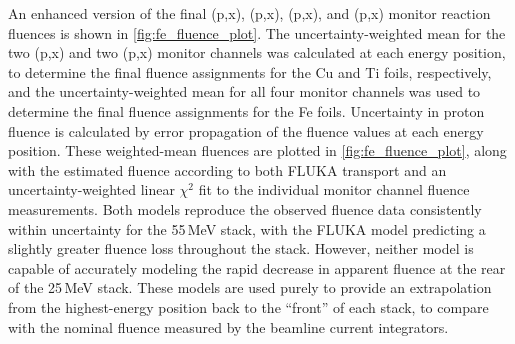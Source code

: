 % 
An enhanced version of the final (p,x), (p,x), (p,x), and (p,x) monitor reaction fluences is shown in \autoref{fig:fe_fluence_plot}.
The uncertainty-weighted mean  for the two (p,x) and two (p,x) monitor channels was calculated at each energy position, to determine the final fluence assignments for the Cu and Ti foils, respectively, and the uncertainty-weighted mean  for all four monitor channels was used to determine the final fluence assignments for the Fe foils.
Uncertainty in proton fluence  is  calculated by error propagation of the fluence values  at each energy position.
These weighted-mean fluences are  plotted  in \autoref{fig:fe_fluence_plot}, along with the estimated fluence according to both  FLUKA transport 
and an uncertainty-weighted linear $\chi^2$ fit to the individual monitor channel fluence measurements.
Both models reproduce the observed fluence data consistently within uncertainty for the 55\,MeV stack, with the FLUKA model predicting a slightly greater fluence loss throughout the stack.
However, neither model is capable of accurately modeling the rapid decrease in apparent fluence at the rear of the 25\,MeV stack.   
These models are used purely to provide an extrapolation from the highest-energy position back to the \enquote{front} of each stack, to compare with the nominal fluence measured by  the beamline current integrators.
% 
% 
% 
% 
% 



